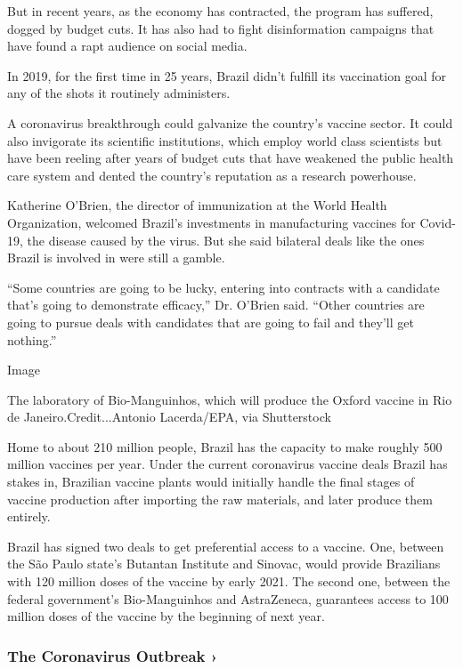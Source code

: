 But in recent years, as the economy has contracted, the program has
suffered, dogged by budget cuts. It has also had to fight disinformation
campaigns that have found a rapt audience on social media.

In 2019, for the first time in 25 years, Brazil didn't fulfill its
vaccination goal for any of the shots it routinely administers.

A coronavirus breakthrough could galvanize the country's vaccine sector.
It could also invigorate its scientific institutions, which employ world
class scientists but have been reeling after years of budget cuts that
have weakened the public health care system and dented the country's
reputation as a research powerhouse.

Katherine O'Brien, the director of immunization at the World Health
Organization, welcomed Brazil's investments in manufacturing vaccines
for Covid-19, the disease caused by the virus. But she said bilateral
deals like the ones Brazil is involved in were still a gamble.

``Some countries are going to be lucky, entering into contracts with a
candidate that's going to demonstrate efficacy,'' Dr. O'Brien said.
``Other countries are going to pursue deals with candidates that are
going to fail and they'll get nothing.''

Image

The laboratory of Bio-Manguinhos, which will produce the Oxford vaccine
in Rio de Janeiro.Credit...Antonio Lacerda/EPA, via Shutterstock

Home to about 210 million people, Brazil has the capacity to make
roughly 500 million vaccines per year. Under the current coronavirus
vaccine deals Brazil has stakes in, Brazilian vaccine plants would
initially handle the final stages of vaccine production after importing
the raw materials, and later produce them entirely.

Brazil has signed two deals to get preferential access to a vaccine.
One, between the São Paulo state's Butantan Institute and Sinovac, would
provide Brazilians with 120 million doses of the vaccine by early 2021.
The second one, between the federal government's Bio-Manguinhos and
AstraZeneca, guarantees access to 100 million doses of the vaccine by
the beginning of next year.

\href{https://www.nytimes3xbfgragh.onion/news-event/coronavirus?action=click\&pgtype=Article\&state=default\&region=MAIN_CONTENT_3\&context=storylines_faq}{}

\hypertarget{the-coronavirus-outbreak-}{%
\subsubsection{The Coronavirus Outbreak
›}\label{the-coronavirus-outbreak-}}

